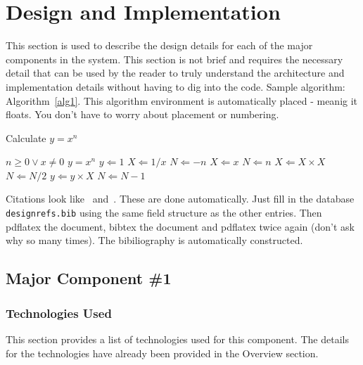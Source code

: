 \chapter{Design  and Implementation}
This section is used to describe the design details for each of the major components 
in the system.  This section is not brief and requires the necessary detail that 
can be used by the reader to truly understand the architecture and implementation 
details without having to dig into the code.    Sample algorithm:  Algorithm~\ref{alg1}.  This algorithm environment is automatically placed - meanig it floats.   You don't have to worry about placement or numbering.  

\begin{algorithm} [tbh]                     %
\caption{Calculate $y = x^n$}          %
\label{alg1}                           %
\begin{algorithmic}                    %
    \REQUIRE $n \geq 0 \vee x \neq 0$
    \ENSURE $y = x^n$
    \STATE $y \Leftarrow 1$
        \STATE $X \Leftarrow 1 / x$
        \STATE $N \Leftarrow -n$
    \ELSE
        \STATE $X \Leftarrow x$
        \STATE $N \Leftarrow n$
    \ENDIF
            \STATE $X \Leftarrow X \times X$
            \STATE $N \Leftarrow N / 2$
        \ELSE[$N$ is odd]
            \STATE $y \Leftarrow y \times X$
            \STATE $N \Leftarrow N - 1$
        \ENDIF
    \ENDWHILE
\end{algorithmic}
\end{algorithm}
Citations look like~\cite{Choset:2005:PRM, arkin2009governing, lavalle2006}  and~\cite{wiki:asimo,lumelsky:1987, nolfi2000evolutionary}.  These are done automatically.  Just fill in the database {\tt designrefs.bib} using the same field structure as the other entries.  Then pdflatex the document, bibtex the document and pdflatex twice again (don't ask why so many times).  The bibiliography is automatically constructed.  
 

\section{Major Component \#1 }

\subsection{Technologies  Used}
This section provides a list of technologies used for this component.  The details 
for the technologies have already been provided in the Overview section. 

